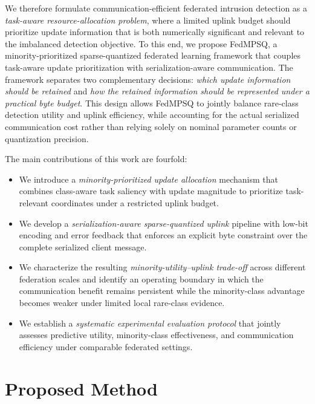 \documentclass[conference,a4paper]{IEEEtran}
\begin{document}
We therefore formulate communication-efficient federated intrusion detection
as a \emph{task-aware resource-allocation problem}, where a limited uplink
budget should prioritize update information that is both numerically
significant and relevant to the imbalanced detection objective. To this end, we
propose FedMPSQ, a minority-prioritized sparse-quantized federated learning
framework that couples task-aware update prioritization with
serialization-aware communication. The framework separates two complementary
decisions: \emph{which update information should be retained} and
\emph{how the retained information should be represented under a practical
byte budget}. This design allows FedMPSQ to jointly balance rare-class
detection utility and uplink efficiency, while accounting for the actual
serialized communication cost rather than relying solely on nominal parameter
counts or quantization precision.

The main contributions of this work are fourfold:
\begin{itemize}
    \item We introduce a \emph{minority-prioritized update allocation}
    mechanism that combines class-aware task saliency with update magnitude
    to prioritize task-relevant coordinates under a restricted uplink budget.

    \item We develop a \emph{serialization-aware sparse-quantized uplink}
    pipeline with low-bit encoding and error feedback that enforces an
    explicit byte constraint over the complete serialized client message.

    \item We characterize the resulting
    \emph{minority-utility--uplink trade-off} across different federation
    scales and identify an operating boundary in which the communication
    benefit remains persistent while the minority-class advantage becomes
    weaker under limited local rare-class evidence.

    \item We establish a \emph{systematic experimental evaluation protocol}
    that jointly assesses predictive utility, minority-class effectiveness,
    and communication efficiency under comparable federated settings.
\end{itemize}


\section{Proposed Method}
\end{document}
